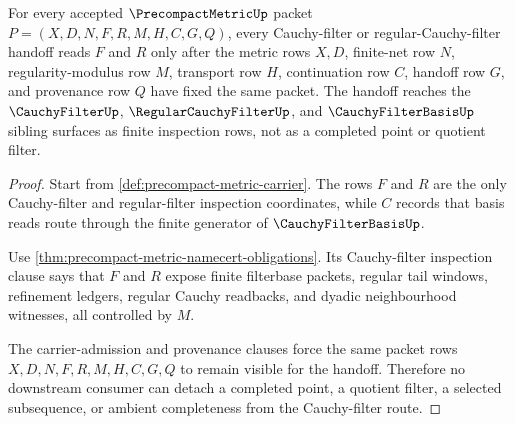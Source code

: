 \begin{theorem}
\label{thm:precompactmetric-cauchy-filter-handoff-obligations}
For every accepted $\PrecompactMetricUp$ packet $P=(X,D,N,F,R,M,H,C,G,Q)$, every Cauchy-filter or regular-Cauchy-filter handoff reads $F$ and $R$ only after the metric rows $X,D$, finite-net row $N$, regularity-modulus row $M$, transport row $H$, continuation row $C$, handoff row $G$, and provenance row $Q$ have fixed the same packet. The handoff reaches the $\CauchyFilterUp$, $\RegularCauchyFilterUp$, and $\CauchyFilterBasisUp$ sibling surfaces as finite inspection rows, not as a completed point or quotient filter.
\end{theorem}
\begin{proof}
Start from \autoref{def:precompact-metric-carrier}. The rows $F$ and $R$ are the only Cauchy-filter and regular-filter inspection coordinates, while $C$ records that basis reads route through the finite generator of $\CauchyFilterBasisUp$.

Use \autoref{thm:precompact-metric-namecert-obligations}. Its Cauchy-filter inspection clause says that $F$ and $R$ expose finite filterbase packets, regular tail windows, refinement ledgers, regular Cauchy readbacks, and dyadic neighbourhood witnesses, all controlled by $M$.

The carrier-admission and provenance clauses force the same packet rows $X,D,N,F,R,M,H,C,G,Q$ to remain visible for the handoff. Therefore no downstream consumer can detach a completed point, a quotient filter, a selected subsequence, or ambient completeness from the Cauchy-filter route.
\end{proof}


